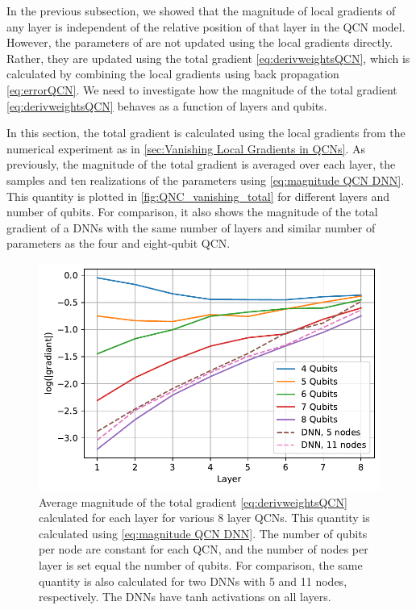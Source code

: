 
In the previous subsection, we showed that the magnitude of local gradients of any layer is independent of the relative position of that layer in the QCN model. However, the parameters of are not updated using the local gradients directly. Rather, they are updated using the total gradient \autoref{eq:derivweightsQCN}, which is calculated by combining the local gradients using back propagation \autoref{eq:errorQCN}. We need to investigate how the magnitude of the total gradient \autoref{eq:derivweightsQCN} behaves as a function of layers and qubits. 

In this section, the total gradient is calculated using the local gradients from the numerical experiment as in \autoref{sec:Vanishing Local Gradients in QCNs}. As previously, the magnitude of the total gradient is averaged over each layer, the samples and ten realizations of the parameters using \autoref{eq:magnitude QCN DNN}. This quantity is plotted in \autoref{fig:QNC_vanishing_total} for different layers and number of qubits. For comparison, it also shows the magnitude of the total gradient of a DNNs with the same number of layers and similar number of parameters as the four and eight-qubit QCN.

\begin{figure}[H]
    \centering
    \includegraphics[width=12cm]{latex/figures/vanishing_gradient_total.pdf}
    \caption{Average magnitude of the total gradient \autoref{eq:derivweightsQCN} calculated for each layer for various 8 layer QCNs. This quantity is calculated using \autoref{eq:magnitude QCN DNN}. The number of qubits per node are constant for each QCN, and the number of nodes per layer is set equal the number of qubits.  For comparison, the same quantity is also calculated for two DNNs with 5 and 11 nodes, respectively. The DNNs have tanh activations on all layers.}
    \label{fig:QNC_vanishing_total}
\end{figure}


